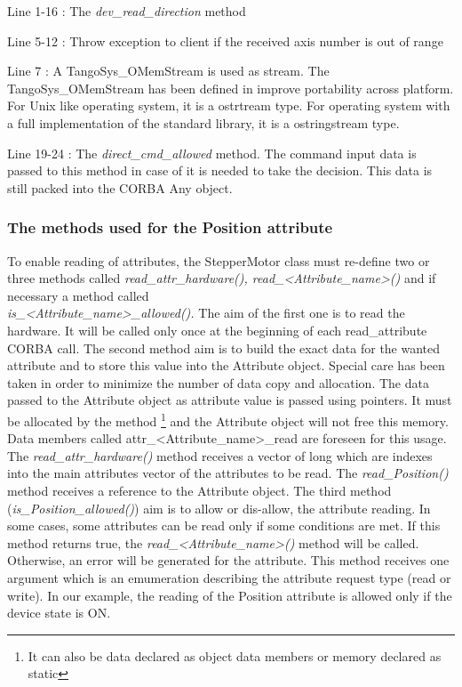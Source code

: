 Line 1-16 : The \emph{dev\_read\_direction} method

Line 5-12 : Throw exception to client if the received axis number
is out of range

Line 7 : A TangoSys\_OMemStream is used as stream. The TangoSys\_OMemStream
has been defined in improve portability across platform. For Unix
like operating system, it is a ostrtream type. For operating system
with a full implementation of the standard library, it is a ostringstream
type.

Line 19-24 : The \emph{direct\_cmd\_allowed} method. The command input
data is passed to this method in case of it is needed to take the
decision. This data is still packed into the CORBA Any object.


\subsubsection{The methods used for the Position attribute}

To enable reading of attributes, the StepperMotor
class must re-define two or three methods called \emph{read\_attr\_hardware(),
read\_<Attribute\_name>()} and if necessary
a method called \\
\emph{is\_<Attribute\_name>\_allowed().} The aim of the first one
is to read the hardware. It will be called only once at the beginning
of each read\_attribute CORBA call. The second method aim is to build
the exact data for the wanted attribute and to store this value into
the Attribute object. Special care has been taken in order to minimize
the number of data copy and allocation. The data passed to the Attribute
object as attribute value is passed using pointers. It must be allocated
by the method%
\footnote{It can also be data declared as object data members or memory declared
as static%
} and the Attribute object will not free this memory.
Data members called attr\_<Attribute\_name>\_read are foreseen for
this usage. The \emph{read\_attr\_hardware()} method receives a vector
of long which are indexes into the main attributes vector of the attributes
to be read. The \emph{read\_Position()} method receives a reference
to the Attribute object. The third method (\emph{is\_Position\_allowed()})
aim is to allow or dis-allow, the attribute reading. In some cases,
some attributes can be read only if some conditions are met. If this
method returns true, the \emph{read\_<Attribute\_name>()} method will
be called. Otherwise, an error will be generated for the attribute.
This method receives one argument which is an emumeration describing
the attribute request type (read or write). In our example, the reading
of the Position attribute is allowed only if the device state is ON.


